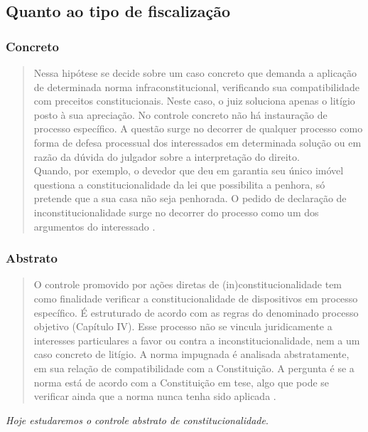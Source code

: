\documentclass{article}
\begin{document}
\subsection{Quanto ao tipo de fiscalização}

\subsubsection{Concreto}

\begin{quote}
    Nessa hipótese se decide sobre um caso concreto que demanda a aplicação de determinada norma infraconstitucional, verificando sua compatibilidade com preceitos constitucionais. Neste caso, o juiz soluciona apenas o litígio posto à sua apreciação. No controle concreto não há instauração de processo específico. A questão surge no decorrer de qualquer processo como forma de defesa processual dos interessados em determinada solução ou em razão da dúvida do julgador sobre a interpretação do direito.\\
    Quando, por exemplo, o devedor que deu em garantia seu único imóvel questiona a constitucionalidade da lei que possibilita a penhora, só pretende que a sua casa não seja penhorada. O pedido de declaração de inconstitucionalidade surge no decorrer do processo como um dos argumentos do interessado \cite[p. 84]{dimoulis_curso_2016}.
\end{quote}

\subsubsection{Abstrato}

\begin{quote}
    O controle promovido por ações diretas de (in)constitucionalidade tem como finalidade verificar a constitucionalidade de dispositivos em processo específico. É estruturado de acordo com as regras do denominado processo objetivo (Capítulo IV). Esse processo não se vincula juridicamente a interesses particulares a favor ou contra a inconstitucionalidade, nem a um caso concreto de litígio. A norma impugnada é analisada abstratamente, em sua relação de compatibilidade com a Constituição. A pergunta é se a norma está de acordo com a Constituição em tese, algo que pode se verificar ainda que a norma nunca tenha sido aplicada \cite[p. 84]{dimoulis_curso_2016}.
\end{quote}

\textit{Hoje estudaremos o controle abstrato de constitucionalidade}.
\end{document}

